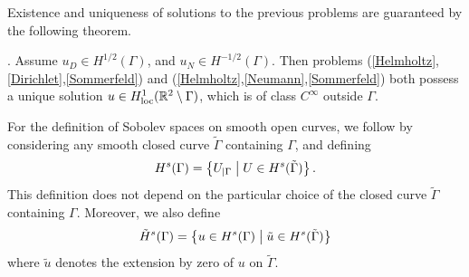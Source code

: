 \documentclass[a4paper]{article}
\begin{document}
\noindent Existence and uniqueness of solutions to the previous problems are guaranteed by the following theorem.
\begin{theorem}
\cite{stephan1984augmented,wendland1990hypersingular,monch1996numerical}. Assume $u_D \in H^{1/2}(\Gamma)$, and $u_N \in H^{-1/2}(\Gamma)$. 
Then problems (\ref{Helmholtz},\ref{Dirichlet},\ref{Sommerfeld}) and (\ref{Helmholtz},\ref{Neumann},\ref{Sommerfeld}) both possess a unique solution 
$u \in H^1_\textup{loc}(\mathbb{R}^2 \setminus \Gamma)$, which is of class $C^{\infty}$ outside $\Gamma$. \end{theorem}
\noindent For the definition of Sobolev spaces on smooth open curves, we follow
\cite{mclean2000strongly} by considering any smooth closed curve $\tilde{\Gamma}$ containing $\Gamma$, and defining 
\[H^s(\Gamma) = \left\{U_{|\Gamma}\mathrel{}\middle|\mathrel{} U \in H^s(\tilde{\Gamma}) \right\}.\]
This definition does not depend on the particular choice of the closed curve $\tilde{\Gamma}$ containing $\Gamma$. Moreover, we also define
\[\tilde{H}^s(\Gamma) = \left\{u \in H^s(\Gamma)\mathrel{}\middle|\mathrel{}\tilde{u} \in H^s(\tilde{\Gamma})\right\}\]
where $\tilde{u}$ denotes the extension by zero of $u$ on $\tilde{\Gamma}$.
\end{document}
